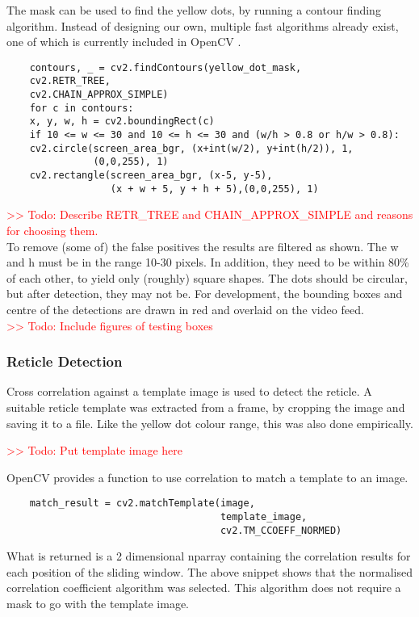 \documentclass[final]{cmpreport_02}
\begin{document}
The mask can be used to find the yellow dots, by running a contour finding algorithm. Instead of designing our own, multiple fast algorithms already exist, one of which is currently included in OpenCV \citep{SUZUKI198532}.
\begin{verbatim}
	contours, _ = cv2.findContours(yellow_dot_mask,
	cv2.RETR_TREE,
	cv2.CHAIN_APPROX_SIMPLE)
	for c in contours:
	x, y, w, h = cv2.boundingRect(c)
	if 10 <= w <= 30 and 10 <= h <= 30 and (w/h > 0.8 or h/w > 0.8):
	cv2.circle(screen_area_bgr, (x+int(w/2), y+int(h/2)), 1,
	           (0,0,255), 1)
	cv2.rectangle(screen_area_bgr, (x-5, y-5),
	              (x + w + 5, y + h + 5),(0,0,255), 1)
\end{verbatim}
\textcolor{red}{>> Todo: Describe RETR\_TREE and CHAIN\_APPROX\_SIMPLE and reasons for choosing them.}\\

To remove (some of) the false positives the results are filtered as shown. The w and h must be in the range 10-30 pixels. In addition, they need to be within 80\% of each other, to yield only (roughly) square shapes. The dots should be circular, but after detection, they may not be. For development, the bounding boxes and centre of the detections are drawn in red and overlaid on the video feed.\\
\textcolor{red}{>> Todo: Include figures of testing boxes}

\subsubsection{Reticle Detection}

Cross correlation against a template image is used to detect the reticle. A suitable reticle template was extracted from a frame, by cropping the image and saving it to a file. Like the yellow dot colour range, this was also done empirically.

\noindent
\textcolor{red}{>> Todo: Put template image here}\noindent

OpenCV provides a function to use correlation to match a template to an image.
\begin{verbatim}
	match_result = cv2.matchTemplate(image,
	                                 template_image,
	                                 cv2.TM_CCOEFF_NORMED)
\end{verbatim}

What is returned is a 2 dimensional nparray containing the correlation results for each position of the sliding window. The above snippet shows that the normalised correlation coefficient algorithm was selected. This algorithm does not require a mask to go with the template image.
\end{document}
